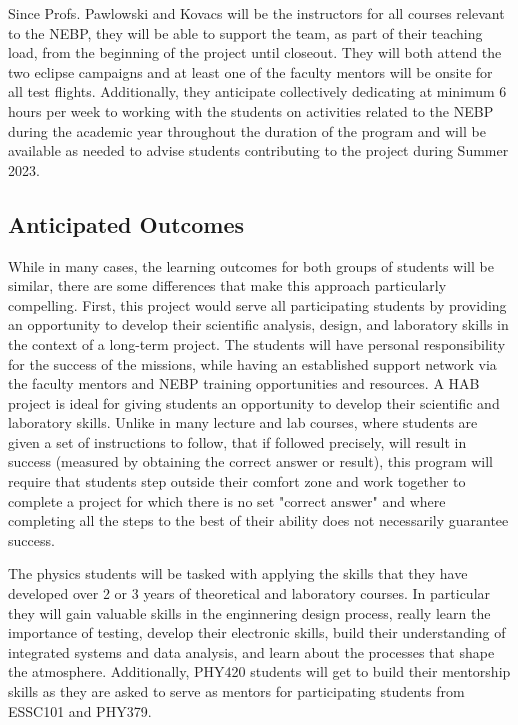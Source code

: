 \documentclass[12pt]{article}
\begin{document}
Since Profs. Pawlowski and Kovacs will be the
instructors for all courses relevant to the NEBP, they will be able to support the
team, as part of their teaching load, from the beginning of the project until
closeout. They will both attend the two eclipse campaigns and at least one
of the faculty mentors will be onsite for all test flights. Additionally,
they anticipate collectively dedicating at minimum 6 hours per week to working with
the students on activities related to the NEBP during the academic year throughout
the duration of the program and will be available as needed to advise students contributing
to the project during Summer 2023.

\subsection{Anticipated Outcomes}
While in many cases, the learning outcomes for both groups of students will be similar, there are
some differences that make this approach particularly compelling. First, this
project would serve all participating students by providing an opportunity to develop
their scientific analysis, design, and laboratory skills in the context of a long-term project. The students will have
personal responsibility for the success of the missions, while having
an established support network via the faculty mentors and NEBP training opportunities and resources.
A HAB project is ideal for giving students an opportunity to develop their scientific and laboratory skills.
Unlike in many lecture and lab courses, where students are given a set of instructions
to follow, that if followed precisely, will result in success (measured by obtaining the correct answer
or result), this program will require that students step outside their comfort zone and work together to
complete a project for which there is no set "correct answer" and where completing all the steps to the
best of their ability does not necessarily guarantee success.

The physics students will be tasked with
applying the skills that they have developed over 2 or 3 years of theoretical and laboratory courses.
In particular they will gain valuable skills in the enginnering design process, really learn the importance
of testing, develop their electronic skills, build their understanding of integrated systems and data analysis,
 and learn
about the processes that shape the atmosphere. Additionally, PHY420 students will
get to build their mentorship skills as they are asked to serve
as mentors for participating students from ESSC101 and PHY379.
\end{document}
